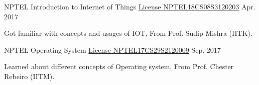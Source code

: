 

\begin{cventries}

   \cventry
	{NPTEL} %
	{Introduction to Internet of Things} %
	{\href{https://drive.google.com/file/d/1OrpPpRIBZCIZtuRxr6yiNakyulA_n5i9/view?usp=sharing}{License NPTEL18CS08S3120203} } %
	{Apr. 2017} %
	{
		\begin{cvitems} %
			\item {Got familiar with concepts and usages of IOT, From Prof. Sudip Mishra (IITK).}
		\end{cvitems}
	}

  \cventry
    {NPTEL} %
    {Operating System} %
    {\href{https://drive.google.com/file/d/1ZQS67kfPQ8NKdGb3ogNG5sn2WeDix-lf/view?usp=sharing}{License NPTEL17CS29S2120009}} %
    {Sep. 2017} %
    {
      \begin{cvitems} %
        \item {Learned about different concepts of Operating system, From Prof. Chester Rebeiro (IITM).}
      \end{cvitems}
    }

\end{cventries}
